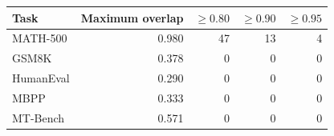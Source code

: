 \begin{tabular}{lrrrr}
\toprule
Task & Maximum overlap & $\geq 0.80$ & $\geq 0.90$ & $\geq 0.95$ \\
\midrule
MATH-500 & 0.980 & 47 & 13 & 4 \\
GSM8K & 0.378 & 0 & 0 & 0 \\
HumanEval & 0.290 & 0 & 0 & 0 \\
MBPP & 0.333 & 0 & 0 & 0 \\
MT-Bench & 0.571 & 0 & 0 & 0 \\
\bottomrule
\end{tabular}
